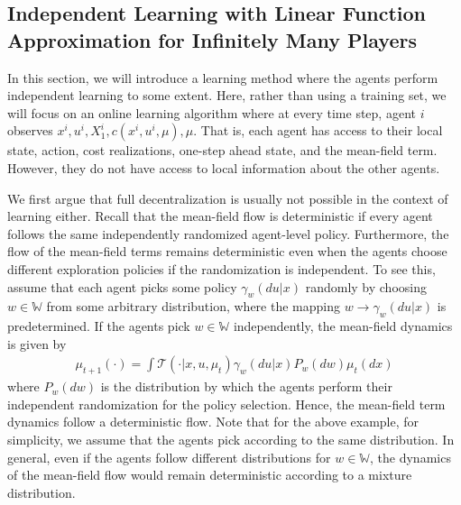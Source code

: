\documentclass[twoside,11pt]{article}
\begin{document}


\subsection{Independent Learning with Linear Function Approximation for Infinitely Many Players}\label{ind_learn_inf}
In this section, we will introduce a learning method where the agents perform independent learning to some extent. Here, rather than using a training set, we will focus on an online learning algorithm where at every time step, agent $i$ observes $x^i,u^i, X_1^i,c(x^i,u^i,\mu),\mu$. That is, each agent has access to their local state, action, cost realizations, one-step ahead state, and the mean-field term. However, they do not have access to local information about the other agents.


We first argue that full decentralization is usually not possible in the context of learning either. Recall that the mean-field flow is deterministic if every agent follows the same independently randomized agent-level policy. Furthermore, the flow of the mean-field terms remains deterministic even when the agents choose different exploration policies if the randomization is independent. To see this, assume that each agent picks some policy $\gamma_w(du|x)$ randomly by choosing $w\in \mathds{W}$ from some arbitrary distribution, where the mapping  $w\to \gamma_w(du|x)$ is predetermined. If the agents pick $w\in\mathds{W}$ independently, the mean-field dynamics is given by
\begin{align*}
\mu_{t+1} (\cdot)= \int \mathcal{T}(\cdot|x,u,\mu_t)\gamma_w(du|x)P_w(dw)\mu_t(dx) 
\end{align*}
where $P_w(dw)$ is the distribution by which the agents perform their independent randomization for the policy selection. Hence, the mean-field term dynamics follow a deterministic flow.  Note that for the above example, for simplicity, we assume that the agents pick according to the same distribution. In general, even if the agents follow different distributions for $w\in\mathds{W}$, the dynamics of the mean-field flow would remain deterministic according to a mixture distribution.  
\end{document}
